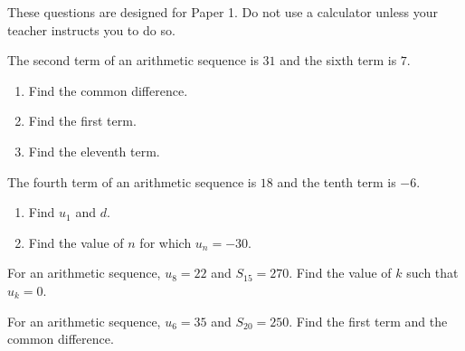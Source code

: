 \begin{practicebox}[title=Practice Set A: Arithmetic sequences]
These questions are designed for Paper 1. Do not use a calculator unless your teacher instructs you to do so.
\end{practicebox}

\begin{examquestion}[6 marks]
The second term of an arithmetic sequence is $31$ and the sixth term is $7$.
\begin{enumerate}[label=(\alph*)]
    \item Find the common difference.
    \item Find the first term.
    \item Find the eleventh term.
\end{enumerate}
\end{examquestion}

\begin{examquestion}[5 marks]
The fourth term of an arithmetic sequence is $18$ and the tenth term is $-6$.
\begin{enumerate}[label=(\alph*)]
    \item Find $u_1$ and $d$.
    \item Find the value of $n$ for which $u_n=-30$.
\end{enumerate}
\end{examquestion}

\begin{examquestion}[6 marks]
For an arithmetic sequence, $u_8=22$ and $S_{15}=270$.
Find the value of $k$ such that $u_k=0$.
\end{examquestion}

\begin{examquestion}[6 marks]
For an arithmetic sequence, $u_6=35$ and $S_{20}=250$.
Find the first term and the common difference.
\end{examquestion}

